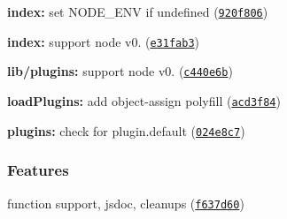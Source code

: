 \begin{DoxyItemize}
\item {\bfseries index\+:} set N\+O\+D\+E\+\_\+\+E\+NV if undefined (\href{https://github.com/michael-ciniawsky/postcss-load-plugins/commit/920f806}{\tt 920f806})
\item {\bfseries index\+:} support node v0. (\href{https://github.com/michael-ciniawsky/postcss-load-plugins/commit/e31fab3}{\tt e31fab3})
\item {\bfseries lib/plugins\+:} support node v0. (\href{https://github.com/michael-ciniawsky/postcss-load-plugins/commit/c440e6b}{\tt c440e6b})
\item {\bfseries load\+Plugins\+:} add object-\/assign polyfill (\href{https://github.com/michael-ciniawsky/postcss-load-plugins/commit/acd3f84}{\tt acd3f84})
\item {\bfseries plugins\+:} check for plugin.\+default (\href{https://github.com/michael-ciniawsky/postcss-load-plugins/commit/024e8c7}{\tt 024e8c7})
\end{DoxyItemize}

\subsubsection*{Features}


\begin{DoxyItemize}
\item function support, jsdoc, cleanups (\href{https://github.com/michael-ciniawsky/postcss-load-plugins/commit/f637d60}{\tt f637d60}) 
\end{DoxyItemize}